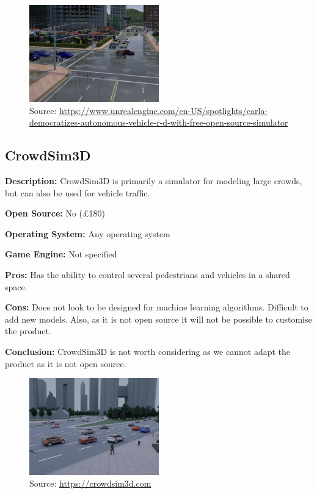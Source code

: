 \begin{figure}[H]
    \centering
    \includegraphics[width=0.5\textwidth]{Simulators/Carla.JPG}
    \caption{Source: \url{https://www.unrealengine.com/en-US/spotlights/carla-democratizes-autonomous-vehicle-r-d-with-free-open-source-simulator}}
\end{figure}


\subsection{CrowdSim3D}
\textbf{Description:} CrowdSim3D is primarily a simulator for modeling large crowds, but can also be used for vehicle traffic. 

\textbf{Open Source:} No (£180)

\textbf{Operating System:} Any operating system

\textbf{Game Engine:} Not specified

\textbf{Pros:} Has the ability to control several pedestrians and vehicles in a shared space.

\textbf{Cons:} Does not look to be designed for machine learning algorithms. Difficult to add new models. Also, as it is not open source it will not be possible to customise the product. 

\textbf{Conclusion:} CrowdSim3D is not worth considering as we cannot adapt the product as it is not open source. 

\begin{figure}[H]
    \centering
    \includegraphics[width=0.5\textwidth]{Simulators/CrowdSim.JPG}
    \caption{Source: \url{https://crowdsim3d.com}}
\end{figure}



